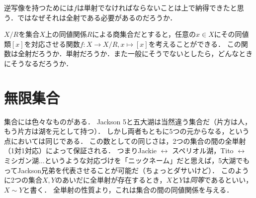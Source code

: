 \documentclass[11pt,a4paper]{jsarticle} %
\begin{document}
\begin{exercise}
 逆写像を持つためには$f$は単射でなければならないことは上で納得できたと思う．ではなぜそれは全射である必要があるのだろうか．
\end{exercise}

\begin{exercise}
$X/R$を集合$X$上の同値関係$R$による商集合だとすると，任意の$x \in X$にその同値類$[x]$を対応させる関数$f:X \to X/R, x \mapsto [x]$を考えることができる．
この関数は全射だろうか．単射だろうか．また一般にそうでないとしたら，どんなときにそうなるだろうか．
\end{exercise}





\section{無限集合}
集合には色々なものがある．
Jackson 5と五大湖は当然違う集合だ（片方は人，もう片方は湖を元として持つ）．
しかし両者もともに5つの元からなる，という点においては同じである．
この数としての同じさは，2つの集合の間の全単射（1対1対応）によって保証される．
つまりJackie $\leftrightarrow$ スペリオル湖，Tito $\leftrightarrow$ ミシガン湖$\dots$というような対応づけを「ニックネーム」だと思えば，5大湖でもってJackson兄弟を代表させることが可能だ（ちょっとダサいけど）．
このように2つの集合$X, Y$のあいだに全単射が存在するとき，$X$と$Y$は\emph{同等}であるといい，$X \sim Y$と書く．
全単射の性質より，これは集合の間の同値関係を与える．
\end{document}

